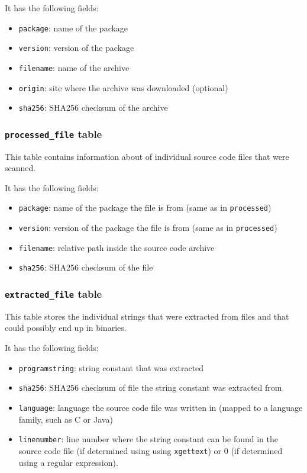 \documentclass[10pt]{article}
\begin{document}
It has the following fields:

\begin{itemize}
\item \texttt{package}: name of the package
\item \texttt{version}: version of the package
\item \texttt{filename}: name of the archive
\item \texttt{origin}: site where the archive was downloaded (optional)
\item \texttt{sha256}: SHA256 checksum of the archive
\end{itemize}

\subsubsection{\texttt{processed\_file} table}
This table contains information about of individual source code files that were
scanned.

It has the following fields:

\begin{itemize}
\item \texttt{package}: name of the package the file is from (same as in
\texttt{processed})
\item \texttt{version}: version of the package the file is from (same as in
\texttt{processed})
\item \texttt{filename}: relative path inside the source code archive
\item \texttt{sha256}: SHA256 checksum of the file
\end{itemize}

\subsubsection{\texttt{extracted\_file} table}
This table stores the individual strings that were extracted from files and
that could possibly end up in binaries.

It has the following fields:

\begin{itemize}
\item \texttt{programstring}: string constant that was extracted
\item \texttt{sha256}: SHA256 checksum of file the string constant was
extracted from
\item \texttt{language}: language the source code file was written in (mapped
to a language family, such as C or Java)
\item \texttt{linenumber}: line number where the string constant can be found
in the source code file (if determined using using \texttt{xgettext}) or $0$
(if determined using a regular expression).
\end{itemize}
\end{document}
